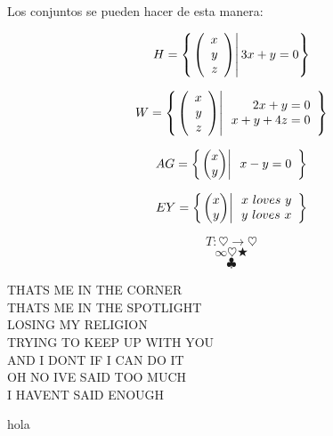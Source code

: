 \documentclass[10pt]{article}
\begin{document}
\problem{}

Los conjuntos se pueden hacer de esta manera:

$$H=\left\{ \left. \left( \begin{array}{r} x\\ y\\ z \end{array} \right) \right| 3x+y=0 \right\} $$

$$W=\left\{ \left. \left( \begin{array}{r} x\\ y\\ z \end{array} \right) \right| \begin{array}{r}
2x+y=0\\
x+y+4z=0\\
\end{array} \right\} $$

$$AG=\llaves{\vectrdos{x}{y}}{\begin{array}{r}
x-y=0\\


\end{array}}$$

$$EY=\left\{ \left. \begin{pmatrix} x\\ y\\ \end{pmatrix} \right| \begin{array}{r}
x\ loves\ y\\
y\ loves\ x\\
\end{array} \right\}$$

$$T : \heartsuit \rightarrow \heartsuit$$
$$\infty \heartsuit \bigstar $$
$$\clubsuit$$

THATS ME IN THE CORNER~\\
THATS ME IN THE SPOTLIGHT\\
LOSING MY RELIGION~\\
TRYING TO KEEP UP WITH YOU~\\
AND I DONT IF I CAN DO IT~\\
OH NO IVE SAID TOO MUCH~\\
I HAVENT SAID ENOUGH

hola
\end{document}

